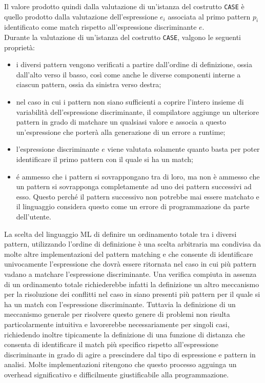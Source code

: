 Il valore prodotto quindi dalla valutazione di un'istanza del costrutto
\texttt{CASE} è quello prodotto dalla valutazione dell’espressione $e_i$
associata al primo pattern $p_i$ identificato come match rispetto
all’espressione discriminante $e$.\\

Durante la valutazione di un'istanza del costrutto \texttt{CASE}, valgono le
seguenti proprietà:

\begin{itemize}
\item i diversi pattern vengono verificati a partire dall’ordine di
  definizione, ossia dall’alto verso il basso, così come anche le diverse
  componenti interne a ciascun pattern, ossia da sinistra verso destra;
\item nel caso in cui i pattern non siano sufficienti a coprire l’intero
  insieme di variabilità dell’espressione discriminante, il compilatore
  aggiunge un ulteriore pattern in grado di matchare un qualsiasi valore e
  associa a questo un’espressione che porterà alla generazione di un errore a
  runtime;
\item l’espressione discriminante $e$ viene valutata solamente quanto basta per
  poter identificare il primo pattern con il quale si ha un match;
\item é ammesso che i pattern si sovrappongano tra di loro, ma non è ammesso
  che un pattern si sovrapponga completamente ad uno dei pattern successivi ad
  esso. Questo perché il pattern successivo non potrebbe mai essere matchato e
  il linguaggio considera questo come un errore di programmazione da parte
  dell'utente.\\
\end{itemize}

La scelta del linguaggio ML di definire un ordinamento totale tra i diversi
pattern, utilizzando l’ordine di definizione è una scelta arbitraria ma
condivisa da molte altre implementazioni del pattern matching e che consente di
identificare univocamente l'espressione che dovrà essere ritornata nel caso in
cui più pattern vadano a matchare l'espressione discriminante. Una verifica
compiuta in assenza di un ordinamento totale richiederebbe infatti la
definizione un altro meccanismo per la risoluzione dei conflitti nel caso in
siano presenti più pattern per il quale si ha un match con l’espressione
discriminante. Tuttavia la definizione di un meccanismo generale per risolvere
questo genere di problemi non risulta particolarmente intuitiva e lavorerebbe
necessariamente per singoli casi, richiedendo inoltre tipicamente la
definizione di una funzione di distanza che consenta di identificare il match
più specifico rispetto all’espressione discriminante in grado di agire a
prescindere dal tipo di espressione e pattern in analisi. Molte implementazioni
ritengono che questo processo agguinga un overhead significativo e
difficilmente giustificabile alla programmazione.\\

